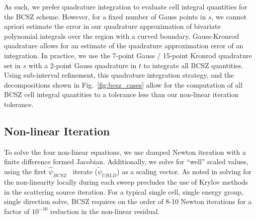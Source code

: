 \documentclass{mc2015}
\newcommand{\fig}[1]{Fig.~\ref{#1}}                      %
\newcommand{\BCSZH}{\ensuremath{\widehat{\psi}_{BCSZ}}}
\begin{document}
As such, we prefer quadrature integration to evaluate cell integral quantities for the BCSZ scheme.
However, for a fixed number of Gauss points in $s$, we cannot apriori estimate the error in our quadrature approximation of bivariate polynomial integrals over the region with a curved boundary.
Gauss-Kronrod quadrature \cite{gk_quad} allows for an estimate of the quadrature approximation error of an integration.
In practice, we use the 7-point Gauss / 15-point Kronrod quadrature set in $s$ with a 2-point Gauss quadrature in $t$ to integrate all BCSZ quantities.
Using  sub-interval refinement, this quadrature integration strategy, and the decompositions shown in \fig{fig:bcsz_cases} allow for the computation of all BCSZ cell integral quantities to a tolerance less than our non-linear iteration tolerance.

\subsection{Non-linear Iteration}
To solve the four non-linear equations, we use damped Newton iteration with a finite difference formed Jacobian.
Additionally, we solve for ``well'' scaled values, using the first \BCSZH~ iterate ($\widetilde{\psi}_{UBLD}$) as a scaling vector.
As noted in \cite{csz_me,csz_don} solving for the non-linearity locally during each sweep precludes the use of Krylov methods in the scattering source iteration.
For a typical single cell, single energy group, single direction solve, BCSZ requires on the order of 8-10 Newton iterations for a factor of $10^{-10}$ reduction in the non-linear residual.
\end{document}

